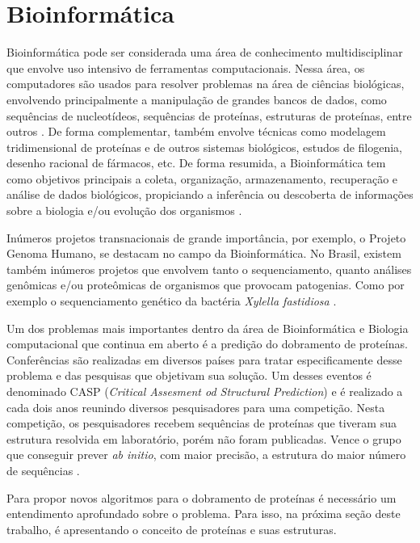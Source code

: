 \documentclass[dm,ppgcomp]{texfurg}
\begin{document}
\section{Bioinformática}

Bioinformática pode ser considerada uma área de conhecimento multidisciplinar que envolve uso intensivo de ferramentas computacionais. Nessa área, os computadores são usados para resolver problemas na área de ciências biológicas, envolvendo principalmente a manipulação de grandes bancos de dados, como sequências de nucleotídeos, sequências de proteínas, estruturas de proteínas, entre outros \cite{mount2004sequence}. De forma complementar, também envolve técnicas como modelagem tridimensional de proteínas e de outros sistemas biológicos, estudos de filogenia, desenho racional de fármacos, etc. De forma resumida, a Bioinformática tem como objetivos principais a coleta, organização, armazenamento, recuperação e análise de dados biológicos, propiciando a inferência ou descoberta de informações sobre a biologia e/ou evolução dos organismos \cite{luscombe2001bioinformatics}.

Inúmeros projetos transnacionais de grande importância, por exemplo, o Projeto Genoma Humano, se destacam no campo da Bioinformática. No Brasil, existem também  inúmeros projetos que envolvem tanto o sequenciamento, quanto análises genômicas e/ou proteômicas de organismos que provocam patogenias. Como por exemplo o sequenciamento genético da bactéria {\it Xylella fastidiosa} \cite{simpson2000genome}.

Um dos problemas mais importantes dentro da área de Bioinformática e Biologia computacional que continua em aberto é a predição do dobramento de proteínas. Conferências são realizadas em diversos países para tratar especificamente desse problema e das pesquisas que objetivam sua solução. Um desses eventos é denominado CASP ({\it Critical Assesment od Structural Prediction}) e é realizado a cada dois anos reunindo diversos pesquisadores para uma competição. Nesta competição, os pesquisadores recebem sequências de proteínas que tiveram sua estrutura resolvida em laboratório, porém não foram publicadas. Vence o grupo que conseguir prever {\it ab initio}, com maior precisão, a estrutura do maior número de sequências \cite{prosdocimi2002bioinformatica}.

Para propor novos algoritmos para o dobramento de proteínas é necessário um entendimento aprofundado sobre o problema. Para isso, na próxima seção deste trabalho, é apresentando o conceito de proteínas e suas estruturas. 
\end{document}
